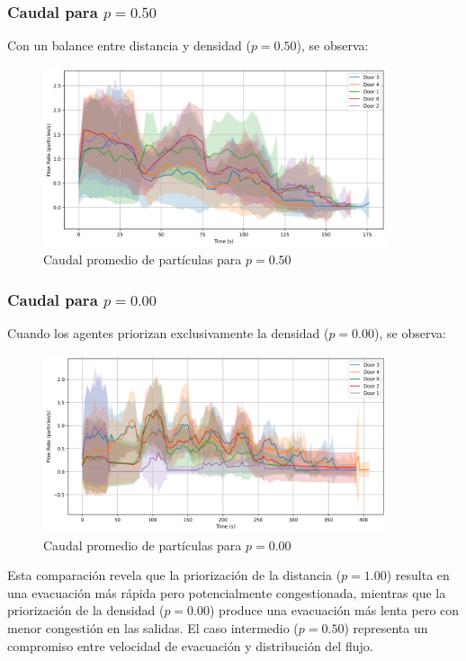 \documentclass[12pt]{article}
\begin{document}
\subsubsection{Caudal para $p = 0.50$}
Con un balance entre distancia y densidad ($p = 0.50$), se observa:

\begin{figure}[H]
    \centering
    \includegraphics[width=0.9\textwidth]{img/door_flow_rates_t_20_&_p_0.50.png}
    \caption{Caudal promedio de partículas para $p=0.50$}
    \label{fig:caudal_p050}
\end{figure}

\subsubsection{Caudal para $p = 0.00$}
Cuando los agentes priorizan exclusivamente la densidad ($p = 0.00$), se observa:

\begin{figure}[H]
    \centering
    \includegraphics[width=0.9\textwidth]{img/door_flow_rates_t_20_&_p_0.00.png}
    \caption{Caudal promedio de partículas para $p=0.00$}
    \label{fig:caudal_p000}
\end{figure}

Esta comparación revela que la priorización de la distancia ($p = 1.00$) resulta en una evacuación más rápida pero potencialmente congestionada, mientras que la priorización de la densidad ($p = 0.00$) produce una evacuación más lenta pero con menor congestión en las salidas. El caso intermedio ($p = 0.50$) representa un compromiso entre velocidad de evacuación y distribución del flujo.
\end{document}
